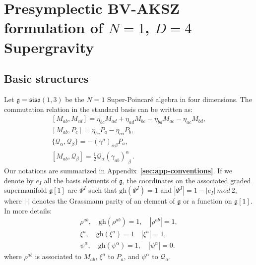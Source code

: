 \documentclass[a4paper,12pt]{article}
\numberwithin{equation}{section} %
\newcommand{\bref}[1]{\textbf{\ref{#1}}}
\newcommand{\p}[1]{|#1|}
\newcommand{\gh}[1]{\mathrm{gh}(#1)}
\newcommand{\Liealg}{\mathfrak}
\newcommand{\algg}{\Liealg{g}}
\numberwithin{equation}{section}
\begin{document}


\section{Presymplectic  BV-AKSZ formulation of $N=1$, $D=4$ Supergravity}
\label{sec:sugra}

\subsection{Basic structures}

Let $\algg=\mathfrak{siso(1,3)}$ be the $N=1$ Super-Poincar\'e algebra in four dimensions. The commutation relation in the standard basis can be written as: 
\begin{equation}
\begin{gathered}
    [M_{ab}, M_{cd}] = \eta_{bc} M_{ad} + \eta_{ad}M_{bc} - \eta_{bd}M_{ac} - \eta_{ac}M_{bd},\\
    [M_{ab}, P_c] = \eta_{bc} P_a - \eta_{ca} P_b,\\
    \{\mathcal{Q}_\alpha, \mathcal{Q}_\beta\} =- (\gamma^a)_{\alpha\beta} P_a,\\
    [M_{ab}, \mathcal{Q}_\beta] = \frac{1}{2} \mathcal{Q}_\alpha (\gamma_{ab})^\alpha_{\enspace \beta}\,.
\end{gathered}
\end{equation}
Our notations are summarized in Appendix~\bref{sec:app-conventions}. If we denote by $e_I$ all the basis elements of $\algg$, the coordinates on the associated graded supermanifold $\algg[1]$ are $\Psi^I$ such that $\gh{\Psi^I}=1$ and $\p{\Psi^I}=1-\p{e_I}~mod~2$,
where $\p{\cdot}$ denotes the Grassmann parity of an element of $\algg$ or a function on $\algg[1]$. In more details:
\begin{equation}
    \begin{gathered}
    \rho^{ab},  \quad \gh{\rho^{ab}} = 1, \quad \p{\rho^{ab}} = 1,\\
    \xi^a, \quad  \gh{\xi^a}=1 \quad \p{\xi^a} = 1,\\
    \psi^\alpha, \quad \gh{\psi^\alpha} = 1, \quad  \p{\psi^\alpha} = 0.
\end{gathered}
\end{equation}
where $\rho^{ab}$ is associated to $M_{ab}$, $\xi^a$ to $P_a$, and $\psi^\alpha$ to $\mathcal{Q}_\alpha$. 
\end{document}
